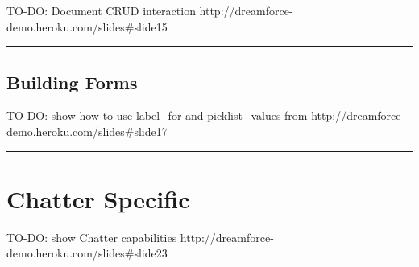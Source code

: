 \documentclass{article}
\begin{document}
TO-DO: Document CRUD interaction http://dreamforce-demo.heroku.com/slides#slide15


\vspace{.5em} \hrule \vspace{.5em}
\hypertarget{building_forms}{}\subsection*{{Building Forms}}\label{building_forms}

TO-DO: show how to use label_for and picklist_values from http://dreamforce-demo.heroku.com/slides#slide17


\vspace{.5em} \hrule \vspace{.5em}
\hypertarget{chatter_specific}{}\section*{{Chatter Specific}}\label{chatter_specific}

TO-DO: show Chatter capabilities http://dreamforce-demo.heroku.com/slides#slide23
\end{document}
